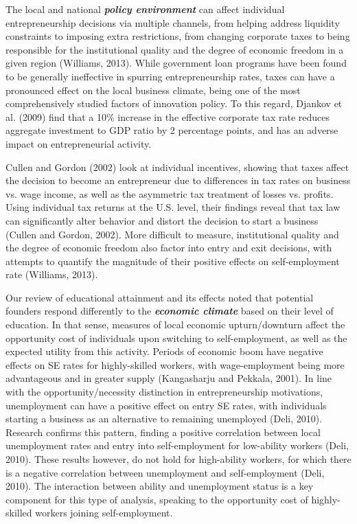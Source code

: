 The local and national \textbf{\textit{policy environment}} can affect individual entrepreneurship decisions via multiple channels, from helping address liquidity constraints to imposing extra restrictions, from changing corporate taxes to being responsible for the institutional quality and the degree of economic freedom in a given region (Williams, 2013). While government loan programs have been found to be generally ineffective in spurring entrepreneurship rates, taxes can have a pronounced effect on the local business climate, being one of the most comprehensively studied factors of innovation policy. To this regard, Djankov et al. (2009) find that a 10\% increase in the effective corporate tax rate reduces aggregate investment to GDP ratio by 2 percentage points, and has an adverse impact on entrepreneurial activity. 

Cullen and Gordon (2002) look at individual incentives, showing that taxes affect the decision to become an entrepreneur due to differences in tax rates on business vs. wage income, as well as the asymmetric tax treatment of losses vs. profits. Using individual tax returns at the U.S. level, their findings reveal that tax law can significantly alter behavior and distort the decision to start a business (Cullen and Gordon, 2002). More difficult to measure, institutional quality and the degree of economic freedom also factor into entry and exit decisions, with attempts to quantify the magnitude of their positive effects on self-employment rate (Williams, 2013).

Our review of educational attainment and its effects noted that potential founders respond differently to the \textbf{\textit{economic climate}} based on their level of education. In that sense, measures of local economic upturn/downturn affect the opportunity cost of individuals upon switching to self-employment, as well as the expected utility from this activity. Periods of economic boom have negative effects on SE rates for highly-skilled workers, with wage-employment being more advantageous and in greater supply (Kangasharju and Pekkala, 2001). In line with the opportunity/necessity distinction in entrepreneurship motivations, unemployment can have a positive effect on entry SE rates, with individuals starting a business as an alternative to remaining unemployed (Deli, 2010). Research confirms this pattern, finding a positive correlation between local unemployment rates and entry into self-employment for low-ability workers (Deli, 2010). These results however, do not hold for high-ability workers, for which there is a negative correlation between unemployment and self-employment (Deli, 2010). The interaction between ability and unemployment status is a key component for this type of analysis, speaking to the opportunity cost of highly-skilled workers joining self-employment. 













